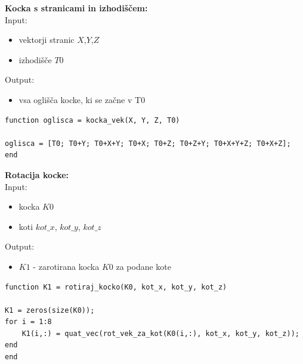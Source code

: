 \documentclass[12pt,a4paper,twoside]{article}
\theoremstyle{definition} %
\theoremstyle{plain} %
\numberwithin{equation}{section}  %
\begin{document}
\vspace{1cm}
\textbf{Kocka s stranicami in izhodiščem:}\\
Input:
\begin{itemize}
\item vektorji stranic $X$,$Y$,$Z$
\item izhodišče $T0$
\end{itemize}
Output:
\begin{itemize}
\item vsa oglišča kocke, ki se začne v T0
\end{itemize}

\begin{lstlisting}[caption = {kocka\_vek}]
function oglisca = kocka_vek(X, Y, Z, T0)

oglisca = [T0; T0+Y; T0+X+Y; T0+X; T0+Z; T0+Z+Y; T0+X+Y+Z; T0+X+Z];
end
\end{lstlisting}

%
%

\vspace{0.5cm}
\textbf{Rotacija kocke:}\\
Input:
\begin{itemize}
\item kocka $K0$
\item koti $kot\_x$, $kot\_y$, $kot\_z$
\end{itemize}
Output:
\begin{itemize}
\item $K1$ - zarotirana kocka $K0$ za podane kote
\end{itemize}

\begin{lstlisting}[caption = {rotiraj\_kocko}]
function K1 = rotiraj_kocko(K0, kot_x, kot_y, kot_z)

K1 = zeros(size(K0));
for i = 1:8
    K1(i,:) = quat_vec(rot_vek_za_kot(K0(i,:), kot_x, kot_y, kot_z));
end
end
\end{lstlisting}
\end{document}
